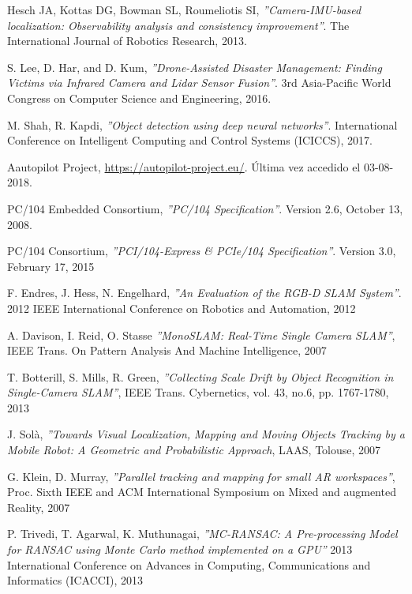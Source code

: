 \begin{thebibliography}{9}
    Hesch JA, Kottas DG, Bowman SL, Roumeliotis SI,
    \textit{''Camera-IMU-based localization: Observability analysis and consistency improvement''}.
    The International Journal of Robotics Research,
    2013.

    S. Lee, D. Har, and D. Kum,
    \textit{''Drone-Assisted Disaster Management: Finding Victims via Infrared Camera and Lidar Sensor Fusion''}.
    3rd Asia-Pacific World Congress on Computer Science and Engineering, 
    2016.

    M. Shah, R. Kapdi,
    \textit{''Object detection using deep neural networks''}.
     International Conference on Intelligent Computing and Control Systems (ICICCS),
     2017.
     
    Aautopilot Project,
    \url{https://autopilot-project.eu/}.
    Última vez accedido el 03-08-2018.

    PC/104 Embedded Consortium,
    \textit{''PC/104 Specification''}.
    Version 2.6,
    October 13, 2008.

    PC/104 Consortium,
    \textit{''PCI/104-Express \& PCIe/104 Specification''}.
    Version 3.0,
    February 17, 2015
    
    F. Endres, J. Hess, N. Engelhard,
    \textit{''An Evaluation of the RGB-D SLAM System''}.
    2012 IEEE International Conference on Robotics and Automation,
    2012
    
    A. Davison, I. Reid, O. Stasse
    \textit{''MonoSLAM: Real-Time Single Camera SLAM''},
    IEEE Trans. On Pattern Analysis And Machine Intelligence,
    2007
    
    T. Botterill, S. Mills, R. Green,
    \textit{''Collecting Scale Drift by Object Recognition in Single-Camera SLAM''},
    IEEE Trans. Cybernetics, vol. 43, no.6, pp. 1767-1780,
    2013

    J. Solà,
    \textit{''Towards Visual Localization, Mapping and Moving Objects Tracking by a Mobile Robot: A Geometric and Probabilistic Approach},
    LAAS, Tolouse,
    2007
    
    G. Klein, D. Murray,
    \textit{''Parallel tracking and mapping for small AR workspaces''},
    Proc. Sixth IEEE and ACM International Symposium on Mixed and augmented Reality,
    2007
    
    P. Trivedi, T. Agarwal, K. Muthunagai,
    \textit{''MC-RANSAC: A Pre-processing Model for RANSAC using Monte Carlo method implemented on a GPU''}
    2013 International Conference on Advances in Computing, Communications and Informatics (ICACCI),
    2013
    

\end{thebibliography}
